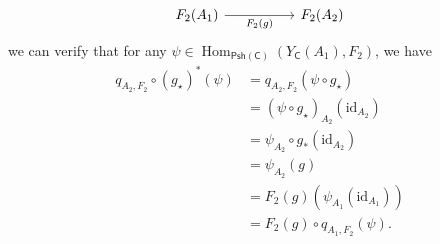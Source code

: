 \begin{prf}
\[\begin{tikzcd}[row sep=3.5em, column sep=2.5em, ampersand replacement=\&]
        {F_2(A_1)} \arrow[rr, "F_2(g)"']      \&  \& {F_2(A_2)}               
    \end{tikzcd}
    \]
    we can verify that for any $\psi\in \operatorname{Hom}_{\mathsf{Psh}(\mathsf{C})}\left(Y_\mathsf{C}(A_1),F_2\right)$, we have
    \begin{align*}
        q_{A_2,F_2}\circ \left(g_\star\right)^*(\psi)&=q_{A_2,F_2}\left(\psi\circ g_\star\right)\\
        &=\left(\psi\circ g_\star\right)_{A_2}\left(\mathrm{id}_{A_2}\right)\\
        &=\psi_{A_2}\circ g_*\left(\mathrm{id}_{A_2}\right)\\
        &=\psi_{A_2}(g)\\
        &=F_2(g)(\psi_{A_1}(\mathrm{id}_{A_1}))\\
        &=F_2(g)\circ q_{A_1,F_2}(\psi).
    \end{align*}
\end{prf}

